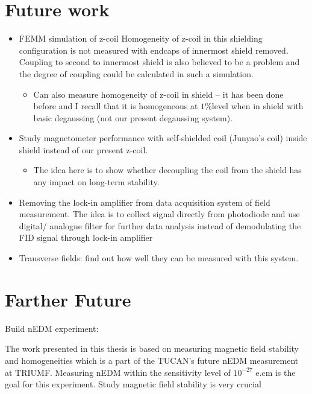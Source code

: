 \section{Future work}
\begin{itemize}
\item	FEMM simulation of z-coil 	Homogeneity of z-coil in this shielding configuration is not  measured with endcaps of innermost shield removed.  Coupling to second to innermost shield is also believed to be a problem and the degree of coupling could be calculated in such a simulation.
\begin{itemize}

\item
Can also measure homogeneity of z-coil in shield – it has been done before and I recall that it is homogeneous at $1\% $level when in shield with basic degaussing (not our present degaussing system).
\end{itemize}
\item
Study magnetometer performance with self-shielded coil (Junyao's coil) inside shield instead of our present z-coil. 
\begin{itemize}
\item	The idea here is to show whether decoupling the coil from the shield has any impact on long-term stability.
\end{itemize}
 \item Removing the lock-in amplifier from data  acquisition system of field measurement. The idea is to collect signal directly from photodiode and use digital/ analogue filter for further data analysis  instead of demodulating the FID signal through lock-in amplifier 

\item Transverse fields: find out how well they can be measured with
  this system.

\end{itemize}

\section{Farther Future}
Build nEDM experiment:

The work presented in this thesis is based on measuring magnetic field stability and homogeneities which is a part of the TUCAN's future nEDM measurement at TRIUMF. Measuring nEDM within the sensitivity level of $10^{-27}$ e.cm is the goal for this experiment. Study magnetic field stability is very crucial %





